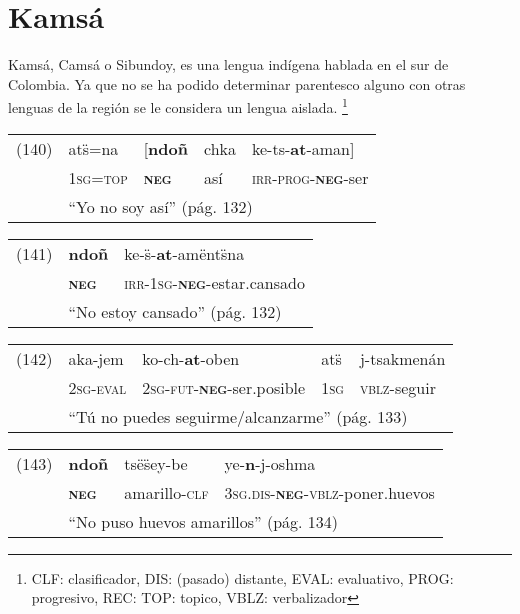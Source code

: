 \section*{Kamsá}

\noindent Kamsá, Camsá o Sibundoy, es una lengua indígena hablada en el sur de Colombia. Ya que no se ha podido determinar parentesco alguno con otras lenguas de la región se le considera un lengua aislada.
\footnote{CLF: clasificador, DIS: (pasado) distante, EVAL: evaluativo, PROG: progresivo, REC: TOP: topico, VBLZ: verbalizador}
\vspace{0.5cm}

{\setmainfont{Charis SIL}

\begin{tabular}{lllll}
(140) & ats̈=na & [\textbf{ndoñ} & chka & ke-ts-\textbf{at}-aman] \\
& \textsc{1sg=top} & \textsc{\textbf{neg}} & así & \textsc{irr-prog-\textbf{neg}-}ser \\
& \multicolumn{4}{l}{``Yo no soy así'' (pág. 132)}
\end{tabular} \vspace{0.5cm}

\begin{tabular}{lll}
(141) & \textbf{ndoñ} & ke-s̈-\textbf{at}-amënts̈na \\
& \textsc{\textbf{neg}} & \textsc{irr-1sg-\textbf{neg}-}estar.cansado \\
& \multicolumn{2}{l}{``No estoy cansado'' (pág. 132)}
\end{tabular} \vspace{0.5cm}

\begin{tabular}{lllll}
(142) & aka-jem & ko-ch-\textbf{at}-oben & ats̈ & j-tsakmenán \\
& \textsc{2sg-eval} & \textsc{2sg-fut-\textbf{neg}-}ser.posible & \textsc{1sg} & \textsc{vblz-}seguir \\
& \multicolumn{4}{l}{``Tú no puedes seguirme/alcanzarme'' (pág. 133)}
\end{tabular} \vspace{0.5cm}

\begin{tabular}{llll}
(143) & \textbf{ndoñ} & tsës̈ey-be & ye-\textbf{n}-j-oshma \\
& \textsc{\textbf{neg}} & amarillo-\textsc{clf} & \textsc{3sg.dis-\textbf{neg}-vblz-}poner.huevos \\
& \multicolumn{3}{l}{``No puso huevos amarillos'' (pág. 134)}
\end{tabular} \vspace{0.5cm}

}
